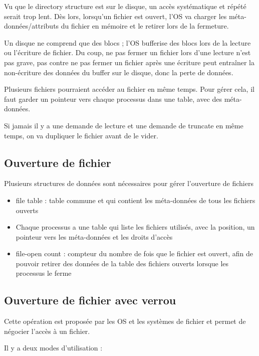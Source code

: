 Vu que le directory structure est sur le disque, un accès systématique et répété serait trop lent. Dès lors, lorsqu'un fichier est ouvert, l'OS va charger les méta-données/attributs du fichier en mémoire et le retirer lors de la fermeture.

Un disque ne comprend que des blocs ; l'OS bufferise des blocs lors de la lecture ou l'écriture de fichier. Du coup, ne pas fermer un fichier lors d'une lecture n'est pas grave, pas contre ne pas fermer un fichier après une écriture peut entraîner la non-écriture des données du buffer sur le disque, donc la perte de données.

Plusieurs fichiers pourraient accéder au fichier en même temps. Pour gérer cela, il faut garder un pointeur vers chaque processus dans une table, avec des méta-données.

Si jamais il y a une demande de lecture et une demande de truncate en même temps, on va dupliquer le fichier avant de le vider.

	\subsection{Ouverture de fichier}
	
	Plusieurs structures de données sont nécessaires pour gérer l'ouverture de fichiers
	
	\begin{itemize}
		
		\item file table : table commune et qui contient les méta-données de tous les fichiers ouverts
		\item Chaque processus a une table qui liste les fichiers utilisés, avec la position, un pointeur vers les méta-données et les droits d'accès
		\item file-open count : compteur du nombre de fois que le fichier est ouvert, afin de pouvoir retirer des données de la table des fichiers ouverts lorsque les processus le ferme
	\end{itemize}
	
	\subsection{Ouverture de fichier avec verrou}
	
	Cette opération est proposée par les OS et les systèmes de fichier et permet de négocier l'accès à un fichier.
	
	Il y a deux modes d'utilisation :
	

